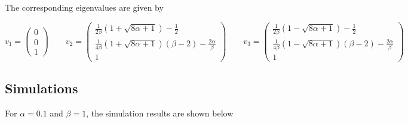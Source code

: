 The corresponding eigenvalues are given by

\begin{equation*}
    v_1 = \begin{pmatrix}
    0 \\ 0 \\ 1
    \end{pmatrix} \qquad
    v_2 = \begin{pmatrix}
    \frac{1}{2\beta} \left( 1 + \sqrt{8\alpha+1} \right) - \frac{1}{2} \\ \frac{1}{4\beta} \left( 1 + \sqrt{8\alpha+1} \right) \left( \beta - 2 \right) - \frac{2\alpha}{\beta} \\ 1
    \end{pmatrix} \qquad
    v_3 = \begin{pmatrix}
    \frac{1}{2\beta} \left( 1 - \sqrt{8\alpha+1} \right) - \frac{1}{2} \\ \frac{1}{4\beta} \left( 1 - \sqrt{8\alpha+1} \right) \left( \beta - 2 \right) - \frac{2\alpha}{\beta} \\ 1
    \end{pmatrix}
\end{equation*}

\subsection{Simulations}

For $\alpha = 0.1$ and $\beta = 1$, the simulation results are shown below

